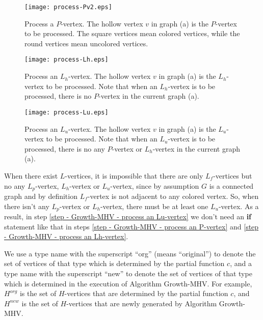 \documentclass[11pt]{article}
\begin{document}
\begin{figure}
\begin{center}
\texttt{[image: process-Pv2.eps]}
\end{center}
\caption{Process a $P$-vertex. The hollow vertex $v$ in graph (a) is
the $P$-vertex to be processed. The square vertices mean colored vertices,
while the round vertices mean uncolored vertices.}
\label{fig - process a P-vertex}
\end{figure}

\begin{figure}
\begin{center}
\texttt{[image: process-Lh.eps]}
\end{center}
\caption{Process an $L_{h}$-vertex. The hollow vertex $v$ in graph (a) is
the $L_{h}$-vertex to be processed. Note that when an $L_{h}$-vertex is
to be processed, there is no $P$-vertex in the current graph (a).}
\label{fig - process a Lh-vertex}
\end{figure}

\begin{figure}
\begin{center}
\texttt{[image: process-Lu.eps]}
\end{center}
\caption{Process an $L_{u}$-vertex. The hollow vertex $v$ in graph (a) is
the $L_{u}$-vertex to be processed. Note that when an $L_{u}$-vertex is
to be processed, there is no any $P$-vertex or $L_{h}$-vertex in the current
graph (a).}
\label{fig - process a Lu-vertex}
\end{figure}


When there exist $L$-vertices, it is impossible that there are only
$L_f$-vertices but no any $L_p$-vertex, $L_{h}$-vertex or $L_{u}$-vertex,
since by assumption $G$ is a connected graph and by definition
$L_f$-vertex is not adjacent to any colored vertex.
So, when there isn't any $L_p$-vertex or $L_{h}$-vertex, there must be
at least one $L_{u}$-vertex.
As a result, in step \ref{step - Growth-MHV - process an Lu-vertex}
we don't need an {\bf if} statement like that in
steps \ref{step - Growth-MHV - process an P-vertex} and
\ref{step - Growth-MHV - process an Lh-vertex}.

We use a type name with the superscript ``org'' (means ``original'') to
denote the set of vertices of that type which is determined by
the partial function $c$, and a type name with the superscript ``new'' to
denote the set of vertices of that type which is determined in the execution
of Algorithm {\sc Growth-MHV}. For example, $H^{org}$ is the set of $H$-vertices
that are determined by the partial function $c$, and $H^{new}$ is the set of
$H$-vertices that are newly generated by Algorithm {\sc Growth-MHV}.
\end{document}
